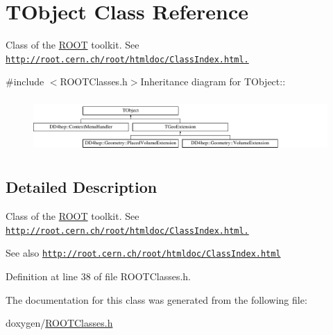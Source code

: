 \hypertarget{class_t_object}{
\section{TObject Class Reference}
\label{class_t_object}
}


Class of the \hyperlink{namespace_r_o_o_t}{ROOT} toolkit. See \href{http://root.cern.ch/root/htmldoc/ClassIndex.html.}{\tt http://root.cern.ch/root/htmldoc/ClassIndex.html.}  


{\ttfamily \#include $<$ROOTClasses.h$>$}Inheritance diagram for TObject::\begin{figure}[H]
\begin{center}
\leavevmode
\includegraphics[height=2.09738cm]{class_t_object}
\end{center}
\end{figure}


\subsection{Detailed Description}
Class of the \hyperlink{namespace_r_o_o_t}{ROOT} toolkit. See \href{http://root.cern.ch/root/htmldoc/ClassIndex.html.}{\tt http://root.cern.ch/root/htmldoc/ClassIndex.html.} \begin{DoxySeeAlso}{See also}
\href{http://root.cern.ch/root/htmldoc/ClassIndex.html}{\tt http://root.cern.ch/root/htmldoc/ClassIndex.html} 
\end{DoxySeeAlso}


Definition at line 38 of file ROOTClasses.h.

The documentation for this class was generated from the following file:\begin{DoxyCompactItemize}
\item 
doxygen/\hyperlink{_r_o_o_t_classes_8h}{ROOTClasses.h}\end{DoxyCompactItemize}
